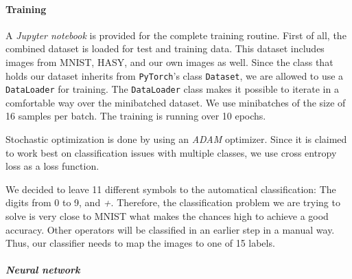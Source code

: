 \documentclass[12pt]{article}
\begin{document}
		
	\paragraph{Training}
		A \textit{Jupyter notebook} is provided for the complete training routine. First of all, the combined dataset is loaded for test and training data. This dataset includes images from MNIST, HASY, and our own images as well. Since the class that holds our dataset inherits from \texttt{PyTorch}'s class \texttt{Dataset}, we are allowed to use a \texttt{DataLoader} for training. The \texttt{DataLoader} class makes it possible to iterate in a comfortable way over the minibatched dataset. We use minibatches of the size of 16 samples per batch. The training is running over 10 epochs.
		
		Stochastic optimization is done by using an \textit{ADAM}\cite{adam} optimizer. Since it is claimed to work best on classification issues with multiple classes, we use cross entropy loss as a loss function.
		
		We decided to leave 11 different symbols to the automatical classification: The digits from 0 to 9,  and \textit{+}. Therefore, the classification problem we are trying to solve is very close to MNIST what makes the chances high to achieve a good accuracy. Other operators will be classified in an earlier step in a manual way. Thus, our classifier needs to map the images to one of 15 labels.
				
		\subparagraph{Neural network}
		
\end{document}
